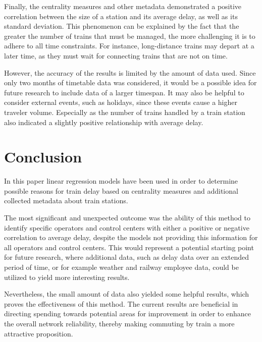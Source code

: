 \documentclass[12pt,a4paper]{article}
\begin{document}
Finally, the centrality measures and other metadata demonstrated a positive correlation between the size of a station and its average delay, as well as its standard deviation. 
This phenomenon can be explained by the fact that the greater the number of trains that must be managed, the more challenging it is to adhere to all time constraints. 
For instance, long-distance trains may depart at a later time, as they must wait for connecting trains that are not on time.

However, the accuracy of the results is limited by the amount of data used. Since only two months of timetable data was considered, it would be a possible idea for future research to include data of a larger timespan. 
It may also be helpful to consider external events, such as holidays, since these events cause a higher traveler volume. Especially as the number of trains handled by a train station also indicated a slightly positive relationship with average delay.

\maketitle
\section{\label{sec:Conclusion}Conclusion}

In this paper linear regression models have been used in order to determine possible reasons for train delay based on centrality measures and additional collected metadata about train stations. 

The most significant and unexpected outcome was the ability of this method to identify specific operators and control centers with either a positive or negative correlation to average delay, despite the models not providing this information for all operators and control centers. 
This would represent a potential starting point for future research, where additional data, such as delay data over an extended period of time, or for example weather and railway employee data, could be utilized to yield more interesting results. 

Nevertheless, the small amount of data also yielded some helpful results, which proves the effectiveness of this method. The current results are beneficial in directing spending towards potential areas for improvement in order to enhance the overall network reliability, thereby making commuting by train a more attractive proposition.
\pagebreak
\listoftables
\listoffigures
\printbibliography
\end{document}
